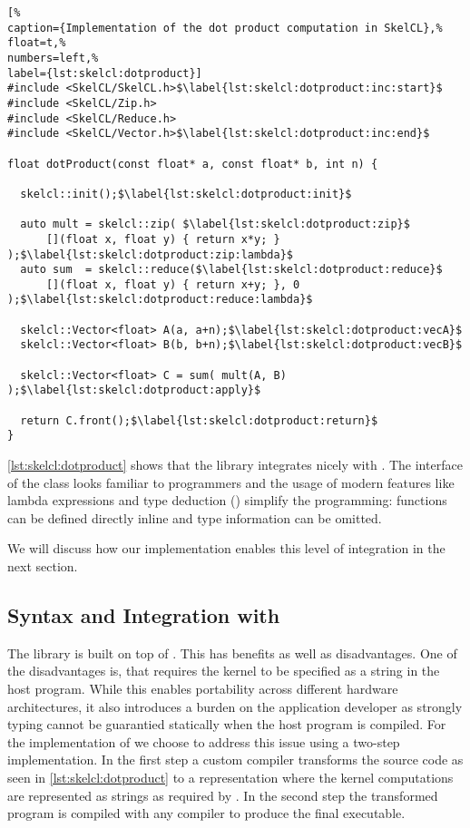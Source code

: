 \begin{lstlisting}[%                                                             
caption={Implementation of the dot product computation in SkelCL},%
float=t,%
numbers=left,%
label={lst:skelcl:dotproduct}]
#include <SkelCL/SkelCL.h>$\label{lst:skelcl:dotproduct:inc:start}$
#include <SkelCL/Zip.h>
#include <SkelCL/Reduce.h>
#include <SkelCL/Vector.h>$\label{lst:skelcl:dotproduct:inc:end}$

float dotProduct(const float* a, const float* b, int n) {

  skelcl::init();$\label{lst:skelcl:dotproduct:init}$

  auto mult = skelcl::zip( $\label{lst:skelcl:dotproduct:zip}$
      [](float x, float y) { return x*y; } );$\label{lst:skelcl:dotproduct:zip:lambda}$
  auto sum  = skelcl::reduce($\label{lst:skelcl:dotproduct:reduce}$
      [](float x, float y) { return x+y; }, 0 );$\label{lst:skelcl:dotproduct:reduce:lambda}$

  skelcl::Vector<float> A(a, a+n);$\label{lst:skelcl:dotproduct:vecA}$
  skelcl::Vector<float> B(b, b+n);$\label{lst:skelcl:dotproduct:vecB}$

  skelcl::Vector<float> C = sum( mult(A, B) );$\label{lst:skelcl:dotproduct:apply}$

  return C.front();$\label{lst:skelcl:dotproduct:return}$
}
\end{lstlisting}

\autoref{lst:skelcl:dotproduct} shows that the \SkelCL library integrates nicely with \Cpp.
The interface of the  class looks familiar to \Cpp programmers and the usage of modern \Cpp features like lambda expressions and type deduction () simplify the programming:
functions can be defined directly inline and type information can be omitted.

We will discuss how our implementation enables this level of integration in the next section.


\subsection{Syntax and Integration with \Cpp}
\label{section:skelcl-library:syntax}

The \SkelCL library is built on top of \OpenCL.
This has benefits as well as disadvantages.
One of the disadvantages is, that \OpenCL requires the kernel to be specified as a string in the host program.
While this enables portability across different hardware architectures, it also introduces a burden on the application developer as strongly typing cannot be guarantied statically when the host program is compiled.
For the implementation of \SkelCL we choose to address this issue using a two-step implementation.
In the first step a custom compiler transforms the source code as seen in \autoref{lst:skelcl:dotproduct} to a representation where the kernel computations are represented as strings as required by \OpenCL.
In the second step the transformed program is compiled with any \Cpp compiler to produce the final executable.

